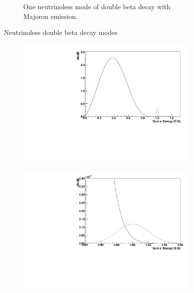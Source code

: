 \documentclass[herrin-thesis.tex]{subfiles}
\begin{document}
\begin{figure}[htp]
\begin{subfigure}[b]{0.48\textwidth}
		\caption[\(0\nu\beta\beta\chi^0\) decay]{One neutrinoless mode of double beta decay with Majoron emission.}
		\label{fig:nu_diagram_0nubbX}
	\end{subfigure}
	\caption[Neutrinoless double beta decay modes]{Neutrinoless double beta decay modes}
	\label{fig:nu_diagrams}
\end{figure}

\begin{figure}[htp]
         \begin{subfigure}[b]{0.48\textwidth}
		\centering
		\includegraphics[width=\textwidth]{./plots/nu_comp_2nu_0nu_1e2.pdf}
	\end{subfigure}\hfill%
         \begin{subfigure}[b]{0.48\textwidth}
		\centering
		\includegraphics[width=\textwidth]{./plots/nu_comp_2nu_0nu_1e6.pdf}

\end{subfigure}
\end{figure}
\end{document}
